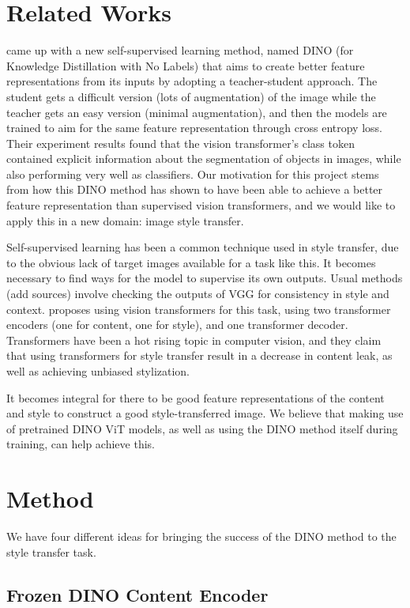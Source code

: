 \documentclass{article}
\begin{document}
\section{Related Works}

\cite{DINO} came up with a new self-supervised learning method, named DINO (for Knowledge Distillation with No Labels) that aims to create better feature representations from its inputs by adopting a teacher-student approach. The student gets a difficult version (lots of augmentation) of the image while the teacher gets an easy version (minimal augmentation), and then the models are trained to aim for the same feature representation through cross entropy loss. Their experiment results found that the vision transformer's class token contained explicit information about the segmentation of objects in images, while also performing very well as classifiers. Our motivation for this project stems from how this DINO method has shown to have been able to achieve a better feature representation than supervised vision transformers, and we would like to apply this in a new domain: image style transfer.

Self-supervised learning has been a common technique used in style transfer, due to the obvious lack of target images available for a task like this. It becomes necessary to find ways for the model to supervise its own outputs. Usual methods (add sources) involve checking the outputs of VGG for consistency in style and context. \cite{ImageStyleTransformer} proposes using vision transformers for this task, using two transformer encoders (one for content, one for style), and one transformer decoder. Transformers have been a hot rising topic in computer vision, and they claim that using transformers for style transfer result in a decrease in content leak, as well as achieving unbiased stylization.

It becomes integral for there to be good feature representations of the content and style to construct a good style-transferred image. We believe that making use of pretrained DINO ViT models, as well as using the DINO method itself during training, can help achieve this.


\section{Method}

We have four different ideas for bringing the success of the DINO method to the style transfer task.

\subsection{Frozen DINO Content Encoder}
\end{document}
